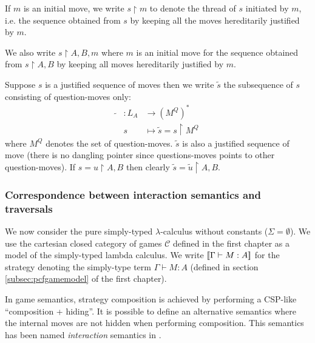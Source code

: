 If $m$ is an initial move, we write $s \upharpoonright m$ to
denote the thread of $s$ initiated by $m$, i.e. the sequence obtained from $s$ by keeping all the moves
hereditarily justified by $m$.

We also write $s \upharpoonright A,B,m$ where $m$ is an initial move
for the sequence obtained from $s \upharpoonright A,B$ by keeping
all moves hereditarily justified by $m$.

\begin{dfn}
Suppose $s$ is a justified sequence of moves then we write $\tilde{s}$
the subsequence of $s$ consisting of question-moves only:
\begin{eqnarray*}
\tilde{} &: L_A &\longrightarrow (M^Q)^* \\
& s &\longmapsto \tilde{s} = s \upharpoonright M^Q
\end{eqnarray*}
where $M^Q$ denotes the set of question-moves.
$\tilde{s}$ is also a justified sequence of move (there is no dangling pointer since questions-moves points to other question-moves).
If $s = u\upharpoonright A,B$ then clearly $\tilde{s} = \tilde{u} \upharpoonright A,B$.
\end{dfn}




\subsubsection{Correspondence between interaction semantics and traversals}

We now consider the pure simply-typed $\lambda$-calculus without
constants ($\Sigma = \emptyset$). We use the cartesian closed
category of games $\mathcal{C}$ defined in the first chapter as a
model of the simply-typed lambda calculus. We write ${[\![ \Gamma
\vdash M : A ]\!]}$ for the strategy denoting the simply-type term
$\Gamma \vdash M : A$ (defined in section \ref{subsec:pcfgamemodel}
of the first chapter).




In game semantics, strategy composition is achieved by performing a CSP-like ``composition + hiding''.
It is possible to define an alternative semantics where the internal moves are not hidden when performing composition.
This semantics has been named \emph{interaction} semantics in \cite{DBLP:conf/sas/DimovskiGL05}.

